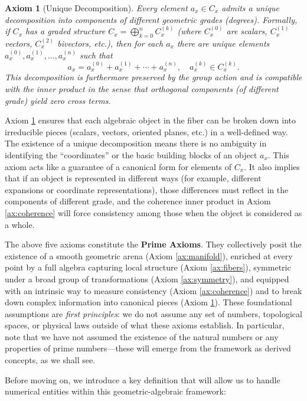 \documentclass[11pt]{article}
\newtheorem{axiom}{Axiom}
\begin{document}
\begin{axiom}[Unique Decomposition]\label{ax:decomposition}
Every element $a_x \in C_x$ admits a unique decomposition into components of different geometric grades (degrees). Formally, if $C_x$ has a graded structure $C_x = \bigoplus_{k=0}^n C_x^{(k)}$ (where $C_x^{(0)}$ are scalars, $C_x^{(1)}$ vectors, $C_x^{(2)}$ bivectors, etc.), then for each $a_x$ there are unique elements $a_x^{(0)}, a_x^{(1)}, \ldots, a_x^{(n)}$ such that 
\[a_x = a_x^{(0)} + a_x^{(1)} + \cdots + a_x^{(n)}, \quad a_x^{(k)} \in C_x^{(k)}.\] 
This decomposition is furthermore preserved by the group action and is compatible with the inner product in the sense that orthogonal components (of different grade) yield zero cross terms.
\end{axiom}

Axiom \ref{ax:decomposition} ensures that each algebraic object in the fiber can be broken down into irreducible pieces (scalars, vectors, oriented planes, etc.) in a well-defined way. The existence of a unique decomposition means there is no ambiguity in identifying the “coordinates” or the basic building blocks of an object $a_x$. This axiom acts like a guarantee of a canonical form for elements of $C_x$. It also implies that if an object is represented in different ways (for example, different expansions or coordinate representations), those differences must reflect in the components of different grade, and the coherence inner product in Axiom \ref{ax:coherence} will force consistency among those when the object is considered as a whole.

\medskip

The above five axioms constitute the \textbf{Prime Axioms}. They collectively posit the existence of a smooth geometric arena (Axiom \ref{ax:manifold}), enriched at every point by a full algebra capturing local structure (Axiom \ref{ax:fibers}), symmetric under a broad group of transformations (Axiom \ref{ax:symmetry}), and equipped with an intrinsic way to measure consistency (Axiom \ref{ax:coherence}) and to break down complex information into canonical pieces (Axiom \ref{ax:decomposition}). These foundational assumptions are \emph{first principles}: we do not assume any set of numbers, topological spaces, or physical laws outside of what these axioms establish. In particular, note that we have not assumed the existence of the natural numbers or any properties of prime numbers---these will emerge from the framework as derived concepts, as we shall see.

Before moving on, we introduce a key definition that will allow us to handle numerical entities within this geometric-algebraic framework:
\end{document}
